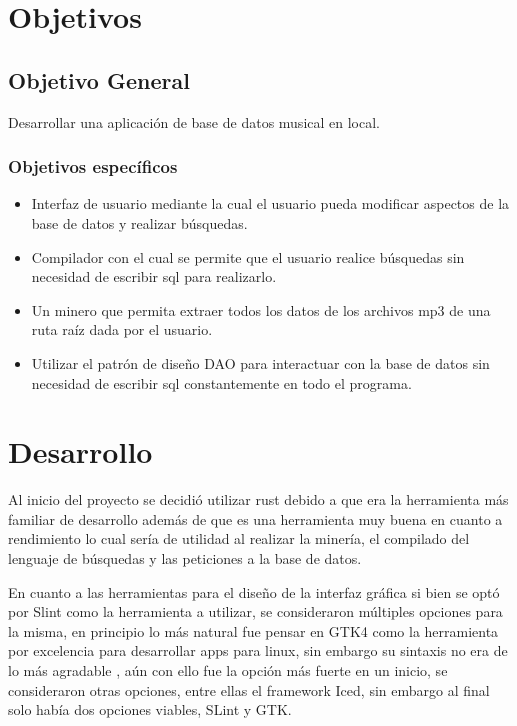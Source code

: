 \documentclass[12pt,a4paper]{article}
\begin{document}
\section{Objetivos}
\subsection{Objetivo General}
Desarrollar una aplicación de base de datos musical en local.
\subsubsection{Objetivos específicos}
\begin{itemize}
  \item Interfaz de usuario mediante la cual el usuario pueda modificar aspectos de la base de datos y 
    realizar búsquedas.
  
  \item Compilador con el cual se permite que el usuario realice búsquedas sin necesidad
    de escribir sql para realizarlo.
  
  \item Un minero que permita extraer todos los datos de los archivos mp3 de una ruta raíz dada por el usuario.
  
  \item Utilizar el patrón de diseño DAO para interactuar con la base de datos sin necesidad de 
    escribir sql constantemente en todo el programa.
\end{itemize}


\section{Desarrollo}
Al inicio del proyecto se decidió utilizar rust debido a que era la herramienta más familiar de desarrollo 
además de que es una herramienta muy buena en cuanto a rendimiento lo cual sería de utilidad al realizar 
la minería, el compilado del lenguaje de búsquedas y las peticiones a la base de datos.

En cuanto a las herramientas para el diseño de la interfaz gráfica si bien se optó por Slint como la herramienta
a utilizar, se consideraron múltiples opciones para la misma, en principio lo más natural fue pensar en GTK4 como
la herramienta por excelencia para desarrollar apps para linux, sin embargo su sintaxis no era de lo más agradable
, aún con ello fue la opción más fuerte en un inicio, se consideraron otras opciones, entre ellas el framework Iced,
sin embargo al final solo había dos opciones viables, SLint y GTK.
\end{document}
